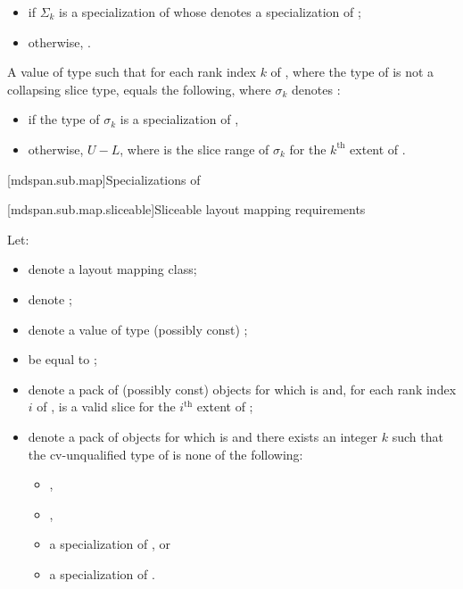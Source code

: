 \begin{itemdescr}
\begin{itemize}
\begin{itemize}
  \item
  if $\Sigma_k$ is a specialization of  whose
   denotes a specialization of ;

  \item
  otherwise,
  .
  \end{itemize}
\end{itemize}

\pnum
\returns
A value  of type  such that
for each rank index $k$ of ,
where the type of  is not a collapsing slice type,
equals the following,
where $\sigma_k$ denotes :
\begin{itemize}
\item
  if the type of $\sigma_k$ is a specialization of ,
\item
  otherwise,
  $U - L$, where  is the  slice range
  of $\sigma_k$ for the $k^\text{th}$ extent of .
\end{itemize}
\end{itemdescr}

[mdspan.sub.map]{Specializations of }

[mdspan.sub.map.sliceable]{Sliceable layout mapping requirements}

\pnum
Let:
\begin{itemize}
\item
   denote a layout mapping class;
\item
   denote ;
\item
   denote a value of type (possibly const) ;
\item
   be equal to ;
\item
   denote a pack of (possibly const) objects
  for which  is  and,
  for each rank index $i$ of ,
   is a valid  slice
  for the $i^\text{th}$ extent of ;
\item
   denote a pack of objects
  for which  is  and
  there exists an integer $k$ such that the cv-unqualified type
  of  is none of the following:
  \begin{itemize}
  \item {},
  \item {},
  \item a specialization of , or
  \item a specialization of .
  \end{itemize}
\end{itemize}

